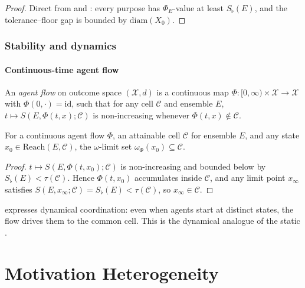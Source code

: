 \documentclass[11pt,a4paper]{article}
\newcommand{\X}{\mathcal{X}}
\newcommand{\Cell}{\mathcal{C}}
\newcommand{\Sfloor}{S_{\flat}}
\newcommand{\diam}{\mathrm{diam}}
\newcommand{\id}{\mathrm{id}}
\newcommand{\Reach}{\mathrm{Reach}}
\begin{document}
\begin{proof}
Direct from  and : every purpose
has $\Phi_E$-value at least $\Sfloor(E)$, and the
tolerance--floor gap is bounded by $\diam(X_0)$.
\end{proof}

\section{Stability and dynamics}
\label{sec:stability}

\subsection{Continuous-time agent flow}

\begin{definition}\label{def:flow}
An \emph{agent flow} on outcome space $(\X,d)$ is a continuous map
$\Phi:[0,\infty)\times\X\to\X$ with $\Phi(0,\cdot)=\id$, such that
for any cell $\Cell$ and ensemble $E$,
$t\mapsto S(E,\Phi(t,x);\Cell)$ is non-increasing whenever
$\Phi(t,x)\notin\Cell$.
\end{definition}

\begin{theorem}\label{thm:omega}
For a continuous agent flow $\Phi$, an attainable cell $\Cell$ for
ensemble $E$, and any state $x_0\in\Reach(E,\Cell)$, the
$\omega$-limit set $\omega_\Phi(x_0)\subseteq\Cell$.
\end{theorem}

\begin{proof}
$t\mapsto S(E,\Phi(t,x_0);\Cell)$ is non-increasing and bounded below
by $\Sfloor(E)<\tau(\Cell)$. Hence $\Phi(t,x_0)$ accumulates inside
$\Cell$, and any limit point $x_\infty$ satisfies
$S(E,x_\infty;\Cell)=\Sfloor(E)<\tau(\Cell)$, so $x_\infty\in\Cell$.
\end{proof}

\begin{remark}\label{rem:dyn-coord}
 expresses dynamical coordination: even when agents
start at distinct states, the flow drives them to the common cell.
This is the dynamical analogue of the static
.
\end{remark}

\part{Motivation Heterogeneity}
\end{document}
